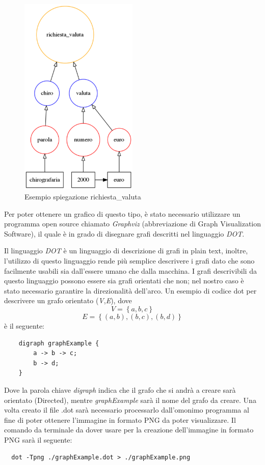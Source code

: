 \begin{figure}[H]
	\centering
	\includegraphics[width=0.5\textwidth]{img/tagRichiesta.png}
	\caption{Esempio spiegazione richiesta\_valuta}
\end{figure}

Per poter ottenere un grafico di questo tipo, è stato necessario utilizzare un programma open source chiamato \emph{Graphviz} (abbreviazione di Graph Visualization Software), il quale è in grado di disegnare grafi descritti nel linguaggio \emph{DOT}.

Il linguaggio \emph{DOT} è un linguaggio di descrizione di grafi in plain text, inoltre, l'utilizzo di questo linguaggio rende più semplice descrivere i grafi dato che sono facilmente usabili sia dall'essere umano che dalla macchina. I grafi descrivibili da questo linguaggio possono essere sia grafi orientati che non; nel nostro caso è stato necessario garantire la direzionalità dell'arco.
\clearpage
Un esempio di codice dot per descrivere un grafo orientato (\emph{V},\emph{E}), dove 
$$V = \left\{ a,b,c \right\} $$
$$E = \left\{ \left( a,b \right) , \left( b,c \right) , \left( b,d \right) \right\} $$
è il seguente:

\begin{verbatim}
	digraph graphExample {
	    a -> b -> c;
	    b -> d;
	}
\end{verbatim}
Dove la parola chiave \emph{digraph} indica che il grafo che si andrà a creare sarà orientato (Directed), mentre \emph{graphExample} sarà il nome del grafo da creare.
Una volta creato il file .dot sarà necessario processarlo dall'omonimo programma al fine di poter ottenere l'immagine in formato PNG da poter visualizzare.
Il comando da terminale da dover usare per la creazione dell'immagine in formato PNG sarà il seguente:
\begin{verbatim}
  dot -Tpng ./graphExample.dot > ./graphExample.png
\end{verbatim}

